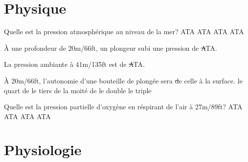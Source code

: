 \documentclass[english,10pt,a4paper,twoside]{article}
\begin{document}
\section{Physique}
	\begin{outline}
		\1 Quelle est la pression atmosphérique au niveau de la mer?
			 ATA
			 ATA
			 ATA
			 ATA

		\1 À une profondeur de 20m/66ft, un plongeur subi une pression de \st ATA.

		\1 La pression ambiante à 41m/135ft est de \st ATA.

		\1 À 20m/66ft, l'autonomie d'une bouteille de plongée sera \st de celle à la surface.
			\2 le quart de
			\2 le tiers de
			\2 la moité de
			\2 le double
			\2 le triple

		\1 Quelle est la pression partielle d'oxygène en réspirant de l'air à 27m/89ft?
			 ATA
			 ATA
			 ATA
			 ATA
	\end{outline}
	\vfill
	\pagebreak

	\section{Physiologie}
\end{document}
